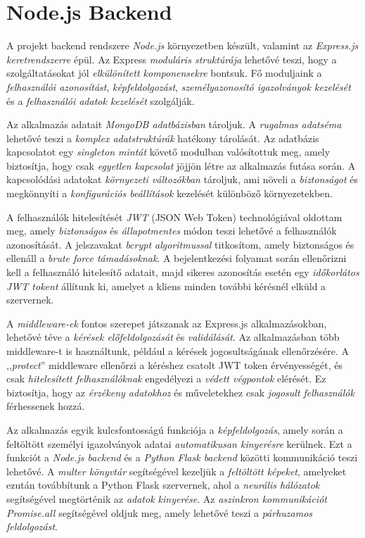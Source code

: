 \documentclass[
]{thesis-ekf}
\theoremstyle{definition}
\theoremstyle{remark}
\begin{document}
\section{Node.js Backend}

A projekt backend rendszere \emph{Node.js} környezetben készült, valamint az \emph{Express.js keretrendszerre} épül. Az Express \emph{moduláris struktúrája} lehetővé teszi, hogy a szolgáltatásokat jól \emph{elkülönített komponensekre} bontsuk. Fő moduljaink a \emph{felhasználói azonosítást}, \emph{képfeldolgozást}, \emph{személyazonosító igazolványok kezelését} és a \emph{felhasználói adatok kezelését} szolgálják.

Az alkalmazás adatait \emph{MongoDB adatbázisban} tároljuk. A \emph{rugalmas adatséma} lehetővé teszi a \emph{komplex adatstruktúrák} hatékony tárolását. Az adatbázis kapcsolatot egy \emph{singleton mintát} követő modulban valósítottuk meg, amely biztosítja, hogy csak \emph{egyetlen kapcsolat} jöjjön létre az alkalmazás futása során. A kapcsolódási adatokat \emph{környezeti változókban} tároljuk, ami növeli a \emph{biztonságot} és megkönnyíti a \emph{konfigurációs beállítások} kezelését különböző környezetekben.

A felhasználók hitelesítését \emph{JWT} (JSON Web Token) technológiával oldottam meg, amely \emph{biztonságos} és \emph{állapotmentes} módon teszi lehetővé a felhasználók azonosítását. A jelszavakat \emph{bcrypt algoritmussal} titkosítom, amely biztonságos és ellenáll a \emph{brute force támadásoknak}. A bejelentkezési folyamat során ellenőrizni kell a felhasználó hitelesítő adatait, majd sikeres azonosítás esetén egy \emph{időkorlátos JWT tokent} állítunk ki, amelyet a kliens minden további kérésnél elküld a szervernek.

A \emph{middleware-ek} fontos szerepet játszanak az Express.js alkalmazásokban, lehetővé téve a \emph{kérések előfeldolgozását} és \emph{validálását}. Az alkalmazásban több middleware-t is használtunk, például a kérések jogosultságának ellenőrzésére. A ,,\emph{protect}'' middleware ellenőrzi a kéréshez csatolt JWT token érvényességét, és csak \emph{hitelesített felhasználóknak} engedélyezi a \emph{védett végpontok} elérését. Ez biztosítja, hogy az \emph{érzékeny adatokhoz} és műveletekhez csak \emph{jogosult felhasználók} férhessenek hozzá.

Az alkalmazás egyik kulcsfontosságú funkciója a \emph{képfeldolgozás}, amely során a feltöltött személyi igazolványok adatai \emph{automatikusan kinyerésre} kerülnek. Ezt a funkciót a \emph{Node.js backend} és a \emph{Python Flask backend} közötti kommunikáció teszi lehetővé. A \emph{multer könyvtár} segítségével kezeljük a \emph{feltöltött képeket}, amelyeket ezután továbbítunk a Python Flask szervernek, ahol a \emph{neurális hálózatok} segítségével megtörténik az \emph{adatok kinyerése}. Az \emph{aszinkron kommunikációt} \emph{Promise.all} segítségével oldjuk meg, amely lehetővé teszi a \emph{párhuzamos feldolgozást}.
\end{document}
